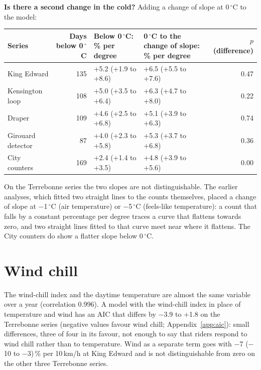 \documentclass[11pt,a4paper]{article}
\begin{document}
\textbf{Is there a second change in the cold?} Adding a change of slope at 0\,$^\circ$C to the model:
\begin{center}\small\begin{tabular}{@{}lrp{3.6cm}p{3.6cm}r@{}}\toprule
Series & Days below 0\,$^\circ$C & Below 0\,$^\circ$C: \% per degree & 0\,$^\circ$C to the change of slope: \% per degree & $p$ (difference)\\\midrule
King Edward & 135 & +5.2 (+1.9 to +8.6) & +6.5 (+5.5 to +7.6) & 0.47 \\
Kensington loop & 108 & +5.0 (+3.5 to +6.4) & +6.3 (+4.7 to +8.0) & 0.22 \\
Draper & 109 & +4.6 (+2.5 to +6.8) & +5.1 (+3.9 to +6.3) & 0.74 \\
Girouard detector & 87 & +4.0 (+2.3 to +5.8) & +5.3 (+3.7 to +6.8) & 0.36 \\
City counters & 169 & +2.4 (+1.4 to +3.5) & +4.8 (+3.9 to +5.6) & 0.00 \\
\bottomrule\end{tabular}\end{center}
On the Terrebonne series the two slopes are not distinguishable. The earlier analyses, which fitted two straight lines to the counts themselves, placed a change of slope at $-$1\,$^\circ$C (air temperature) or $-$5\,$^\circ$C (feels-like temperature): a count that falls by a constant percentage per degree traces a curve that flattens towards zero, and two straight lines fitted to that curve meet near where it flattens. The City counters do show a flatter slope below 0\,$^\circ$C.

\section{Wind chill}
The wind-chill index and the daytime temperature are almost the same variable over a year (correlation 0.996). A model with the wind-chill index in place of temperature and wind has an AIC that differs by $-$3.9 to +1.8 on the Terrebonne series (negative values favour wind chill; Appendix~\ref{app:aic}): small differences, three of four in its favour, not enough to say that riders respond to wind chill rather than to temperature. Wind as a separate term goes with $-$7 ($-$10 to $-$3)\,\% per 10\,km/h at King Edward and is not distinguishable from zero on the other three Terrebonne series.
\end{document}

